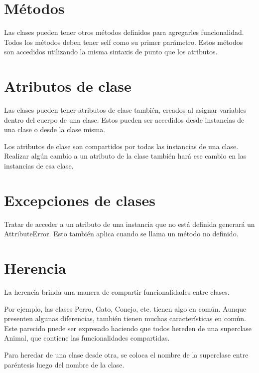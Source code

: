 \documentclass{report}
\begin{document}
\section{Métodos}

Las clases pueden tener otros métodos definidos para agregarles funcionalidad. Todos los métodos deben tener self como su primer parámetro.
Estos métodos son accedidos utilizando la misma sintaxis de punto que los atributos.


\section{Atributos de clase}

Las clases pueden tener atributos de clase también, creados al asignar variables dentro del cuerpo de una clase. Estos pueden ser accedidos desde instancias de una clase o desde la clase misma.


Los atributos de clase son compartidos por todas las instancias de una clase. Realizar algún cambio a un atributo de la clase también hará ese cambio en las instancias de esa clase.


\section{Excepciones de clases}

Tratar de acceder a un atributo de una instancia que no está definida generará un AttributeError. Esto también aplica cuando se llama un método no definido.


\section{Herencia}

La herencia brinda una manera de compartir funcionalidades entre clases.

Por ejemplo, las clases Perro, Gato, Conejo, etc. tienen algo en común. Aunque presenten algunas diferencias, también tienen muchas características en común. Este parecido puede ser expresado haciendo que todos hereden de una superclase Animal, que contiene las funcionalidades compartidas.

Para heredar de una clase desde otra, se coloca el nombre de la superclase entre paréntesis luego del nombre de la clase.
\end{document}
